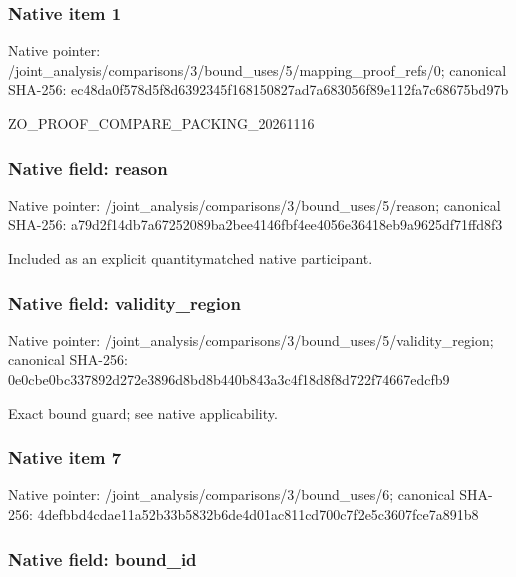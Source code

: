 \documentclass[10pt,a4paper]{article}
\begin{document}
\subsubsection{Native item 1}


Native pointer: /joint\_analysis/comparis\allowbreak{}ons/3/bound\_uses/5/mappi\allowbreak{}ng\_proof\_refs/0; canonical SHA-256: ec48da0f578d5f8d6392345f\allowbreak{}168150827ad7a683056f89e1\allowbreak{}12fa7c68675bd97b


ZO\_PROOF\_COMPARE\_PACKING\_20261116


\subsubsection{Native field: reason}


Native pointer: /joint\_analysis/comparis\allowbreak{}ons/3/bound\_uses/5/reaso\allowbreak{}n; canonical SHA-256: a79d2f14db7a67252089ba2b\allowbreak{}ee4146fbf4ee4056e36418eb\allowbreak{}9a9625df71ffd8f3


Included as an explicit quantitymatched native participant.


\subsubsection{Native field: validity\_region}


Native pointer: /joint\_analysis/comparis\allowbreak{}ons/3/bound\_uses/5/valid\allowbreak{}ity\_region; canonical SHA-256: 0e0cbe0bc337892d272e3896\allowbreak{}d8bd8b440b843a3c4f18d8f8\allowbreak{}d722f74667edcfb9


Exact bound guard; see native applicability.


\subsubsection{Native item 7}


Native pointer: /joint\_analysis/comparis\allowbreak{}ons/3/bound\_uses/6; canonical SHA-256: 4defbbd4cdae11a52b33b583\allowbreak{}2b6de4d01ac811cd700c7f2e\allowbreak{}5c3607fce7a891b8



\subsubsection{Native field: bound\_id}
\end{document}
